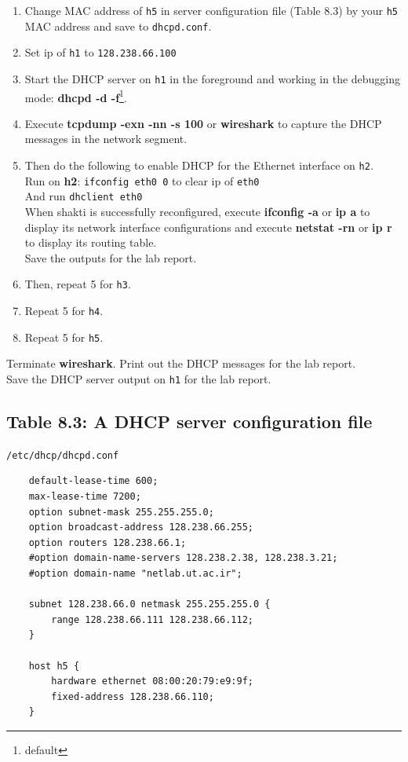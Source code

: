 \documentclass{../UTNetLab}
\begin{document}
    \begin{enumerate}
        \item Change MAC address of \texttt{h5} in server configuration file (Table 8.3) by your \texttt{h5} MAC address and save to \texttt{dhcpd.conf}.
        \item Set ip of \texttt{h1} to \texttt{128.238.66.100}
        \item Start the DHCP server on \texttt{h1} in the foreground and working in the debugging mode: \textbf{dhcpd -d -f}\footnote{default }.
        \item Execute \textbf{tcpdump -exn -nn -s 100} or \textbf{wireshark} to capture the DHCP messages in the network segment.
        \item Then do the following to enable DHCP for the Ethernet interface on \texttt{h2}. \\
        Run on \textbf{h2}: \texttt{ifconfig eth0 0} to clear ip of \texttt{eth0}\\
        And run \texttt{dhclient eth0}\\
        When shakti is successfully reconfigured, execute \textbf{ifconfig -a} or \textbf{ip a} to display its
        network interface configurations and execute \textbf{netstat -rn} or \textbf{ip r} to display its routing table.\\
        Save the outputs for the lab report.
        \item Then, repeat 5 for \texttt{h3}.
        \item Repeat 5 for \texttt{h4}.
        \item Repeat 5 for \texttt{h5}.
    \end{enumerate}
    Terminate \textbf{wireshark}. Print out the DHCP messages for the lab report. \\
    Save the DHCP server output on \texttt{h1} for the lab report.

    \subsection*{Table 8.3: A DHCP server configuration file}
    \texttt{/etc/dhcp/dhcpd.conf}
    \begin{verbatim}
    default-lease-time 600;
    max-lease-time 7200;
    option subnet-mask 255.255.255.0;
    option broadcast-address 128.238.66.255;
    option routers 128.238.66.1;
    #option domain-name-servers 128.238.2.38, 128.238.3.21;
    #option domain-name "netlab.ut.ac.ir";

    subnet 128.238.66.0 netmask 255.255.255.0 {
        range 128.238.66.111 128.238.66.112;
    }

    host h5 {
        hardware ethernet 08:00:20:79:e9:9f;
        fixed-address 128.238.66.110;
    }
    \end{verbatim}
\end{document}
